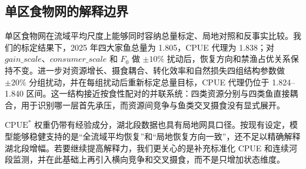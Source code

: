 \subsection{单区食物网的解释边界}
单区食物网在流域平均尺度上能够同时容纳总量标定、局地对照和反事实比较。我们的标定结果下，2025 年四大家鱼总量为 1.805，CPUE 代理为 1.838；对 $gain\_scale$、$consumer\_scale$ 和 $F_0$ 做 $\pm10\%$ 扰动后，恢复方向和禁渔占优关系保持不变。进一步对资源增长、摄食耦合、转化效率和自然损失四组结构参数做 $\pm20\%$ 分组扰动，并在每组扰动后重新标定总量目标，CPUE 代理仍位于 1.824--1.840 区间。这一结构接近按食性配对的并联系统：四类资源分别与四类鱼直接耦合，用于识别哪一层首先承压，而资源间竞争与鱼类交叉摄食没有显式展开。

$\mathrm{CPUE}^*$ 权重仍带有经验成分，湖北段数据也具有局地网具口径。按现有设定，模型能够稳健支持的是“全流域平均恢复”和“局地恢复方向一致”，还不足以精确解释湖北段增幅。若要继续提高解释力，我们更关心的是补充标准化 CPUE 和连续河段监测，并在此基础上再引入横向竞争和交叉摄食，而不是只增加状态维度。

